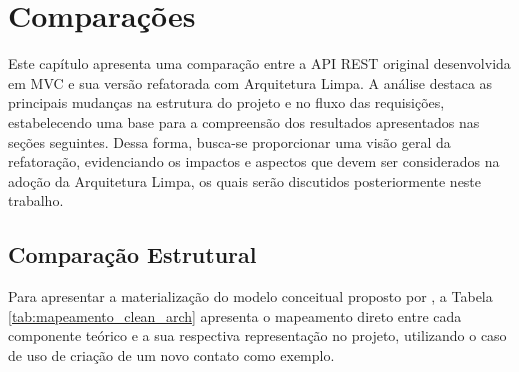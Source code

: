 \chapter{Comparações}
    \par Este capítulo apresenta uma comparação entre a API REST original desenvolvida em MVC e sua versão refatorada com Arquitetura Limpa. A análise destaca as principais mudanças na estrutura do projeto e no fluxo das requisições, estabelecendo uma base para a compreensão dos resultados apresentados nas seções seguintes. Dessa forma, busca-se proporcionar uma visão geral da refatoração, evidenciando os impactos e aspectos que devem ser considerados na adoção da Arquitetura Limpa, os quais serão discutidos posteriormente neste trabalho.
    
    \section{Comparação Estrutural}
        \par Para apresentar a materialização do modelo conceitual proposto por \cite{livro:martin:cleanarch}, a Tabela \ref{tab:mapeamento_clean_arch} apresenta o mapeamento direto entre cada componente teórico e a sua respectiva representação no projeto, utilizando o caso de uso de criação de um novo contato como exemplo.
        
